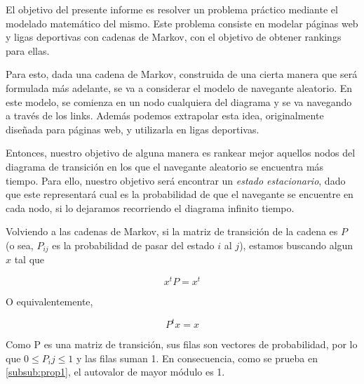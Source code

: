 
El objetivo del presente informe es resolver un problema práctico mediante el modelado matemático del mismo. Este problema consiste en modelar páginas web y ligas deportivas con cadenas de Markov, con el objetivo de obtener rankings para ellas.

Para esto, dada una cadena de Markov, construida de una cierta manera que será formulada más adelante, se va a considerar el modelo de navegante aleatorio. En este modelo, se comienza en un nodo cualquiera del diagrama y se va navegando a trav\'es de los links. Además podemos extrapolar esta idea, originalmente diseñada para páginas web, y utilizarla en ligas deportivas.

Entonces, nuestro objetivo de alguna manera es rankear mejor aquellos nodos del diagrama de transición en los que el navegante aleatorio se encuentra más tiempo. Para ello, nuestro objetivo será encontrar un \emph{estado estacionario}, dado que este representará cual es la probabilidad de que el navegante se encuentre en cada nodo, si lo dejaramos recorriendo el diagrama infinito tiempo.

Volviendo a las cadenas de Markov, si la matriz de transición de la cadena es $P$ (o sea, $P_{ij}$ es la probabilidad de pasar del estado $i$ al $j$), estamos buscando algun $x$ tal que

\[ x^t P = x^t \]

O equivalentemente,

\[P^t x = x\]

Como P es una matriz de transición, sus filas son vectores de probabilidad, por lo que $0 \leq P_ij \leq 1$ y las filas suman 1. En consecuencia, como se prueba en \ref{subsub:prop1}, el autovalor de mayor módulo es 1.


